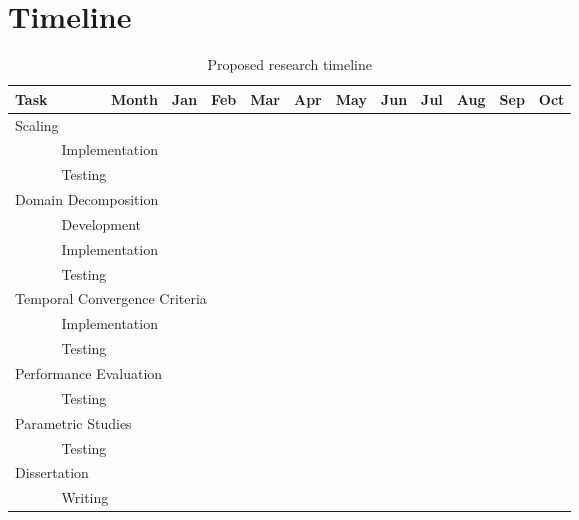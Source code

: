 \section{Timeline}
\label{sect:proposal_time_line}

\newcommand{\cc}{\cellcolor{black}}
\begin{table}[ht]
\singlespace
\centering
\begin{tabular}{@{}l l c c c c  c c c c c c @{}} \toprule
Task & \multicolumn{1}{r}{Month} & Jan & Feb & Mar & Apr & May & Jun & Jul & Aug & Sep & Oct\\
\midrule
\multicolumn{12}{l}{Scaling}  \\
& Implementation & \cc & \cc &     &     &     &     &     &     &     &     \\
& Testing        &     & \cc & \cc &     &     &     &     &     &     &     \\
\multicolumn{12}{l}{Domain Decomposition} \\
& Development    & \cc & \cc &     &     &     &     &     &     &     &     \\
& Implementation &     & \cc & \cc & \cc & \cc &     &     &     &     &     \\
& Testing        &     &     &     &     & \cc & \cc &     &     &     &     \\
\multicolumn{12}{l}{Temporal Convergence Criteria}\\
& Implementation & \cc & \cc &     &     &     &     &     &     &     &     \\
& Testing        &     &     & \cc & \cc &     &     &     &     &     &     \\
\multicolumn{12}{l}{Performance Evaluation} \\
& Testing        &     &     &     &     &     & \cc & \cc &     &     &     \\
\multicolumn{12}{l}{Parametric Studies} \\
& Testing        &     &     &     &     &     & \cc & \cc & \cc &     &     \\
\multicolumn{12}{l}{Dissertation} \\
& Writing        & \cc & \cc & \cc & \cc & \cc & \cc & \cc & \cc & \cc & \cc \\
\bottomrule  
\end{tabular}
\caption{Proposed research timeline}
\label{tab:time_line}
\end{table}

